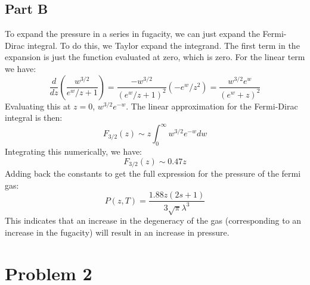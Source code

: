 \documentclass[a4paper, 11pt]{article}
\begin{document}
	\subsection*{Part B}
		To expand the pressure in a series in fugacity, we can just expand the Fermi-Dirac integral. To do 
		this, we Taylor expand the integrand. The first term in the expansion is just the function evaluated 
		at zero, which is zero. For the linear term we have:
		\begin{equation*}
			\frac{d}{dz}\left(\frac{w^{3/2}}{e^w/z + 1}\right) = \frac{-w^{3/2}}{(e^w/z+1)^2}(-e^w/z^2) = \frac{w^{3/2}e^w}{(e^w + z)^2}
		\end{equation*}
		Evaluating this at $z=0$, $w^{3/2}e^{-w}$. The linear approximation for the Fermi-Dirac integral is 
		then:
		\begin{equation*}
			F_{3/2}(z) \sim z\int_0^\infty w^{3/2}e^{-w}dw
		\end{equation*}
		Integrating this numerically, we have:
		\begin{equation*}
			F_{3/2}(z) \sim 0.47z
		\end{equation*} 
		Adding back the constants to get the full expression for the pressure of the fermi gas:
		\begin{equation*}
			P(z, T) = \frac{1.88z(2s+1)}{3\sqrt{\pi}\lambda^3}
		\end{equation*}
		This indicates that an increase in the degeneracy of the gas (corresponding to an increase in the 
		fugacity) will result in an increase in pressure. 
\section*{Problem 2}
		
\end{document}
